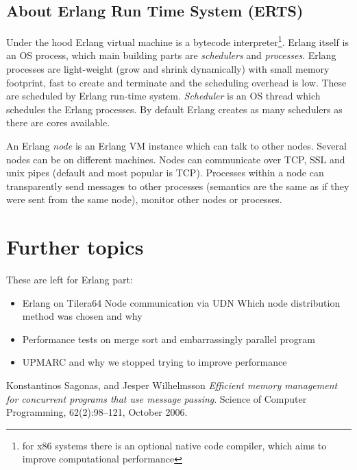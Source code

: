 \documentclass[english,11pt]{article}
\begin{document}
\subsection{About Erlang Run Time System (ERTS)}

Under the hood Erlang virtual machine is a bytecode interpreter\footnote{for
x86 systems there is an optional native code compiler, which aims to improve
computational performance\cite{hipe}}. Erlang itself is an OS process, which
main building parts are {\em schedulers} and {\em processes}. Erlang processes
are light-weight (grow and shrink dynamically) with small memory footprint,
fast to create and terminate and the scheduling overhead is low. These are
scheduled by Erlang run-time system. {\em Scheduler} is an OS thread which
schedules the Erlang processes. By default Erlang creates as many schedulers as
there are cores available.

An Erlang {\em node} is an Erlang VM instance which can talk to other nodes.
Several nodes can be on different machines. Nodes can communicate over TCP, SSL
and unix pipes (default and most popular is TCP). Processes within a node can
transparently send messages to other processes (semantics are the same as if
they were sent from the same node), monitor other nodes or processes.

\section{Further topics}

These are left for Erlang part:
\begin{itemize}
    \item Erlang on Tilera64
        \subitem Node communication via UDN
        \subitem Which node distribution method was chosen and why
    \item Performance tests on merge sort and embarrassingly parallel program
    \item UPMARC and why we stopped trying to improve performance
\end{itemize}


\clearpage
\begin{thebibliography}{9}

     Konstantinos Sagonas, and Jesper Wilhelmsson \emph{Efficient
    memory management for concurrent programs that use message passing}.
    Science of Computer Programming, 62(2):98--121, October 2006.

\end{thebibliography}
\end{document}
